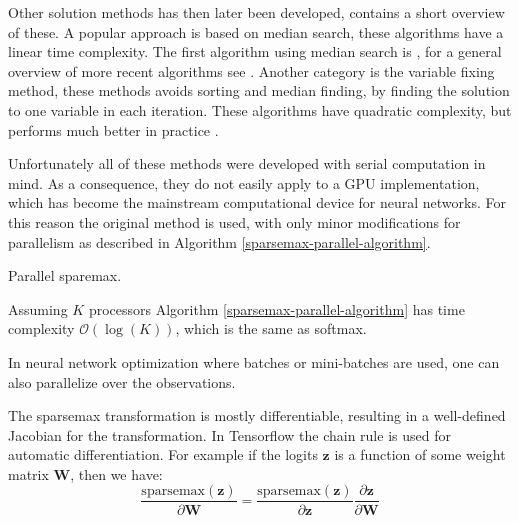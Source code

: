 Other solution methods has then later been developed, \cite{Liu2016} contains a short overview of these. A popular approach is based on median search, these algorithms have a linear time complexity. The first algorithm using median search is \cite{brucker1984a}, for a general overview of more recent algorithms see \cite{kiwiel2008a-median}. Another category is the variable fixing method, these methods avoids sorting and median finding, by finding the solution to one variable in each iteration. These algorithms have quadratic complexity, but performs much better in practice \cite{kiwiel2008a-fixing}.

Unfortunately all of these methods were developed with serial computation in mind. As a consequence, they do not easily apply to a GPU implementation, which has become the mainstream computational device for neural networks. For this reason the original method \cite{Helgason1980} is used, with only minor modifications for parallelism as described in Algorithm \ref{sparsemax-parallel-algorithm}.

\begin{algorithm}[H]
  \caption{Parallel sparemax.}
  \begin{algorithmic}[1]
       
       
       
      \State {}
    \EndFunction
  \end{algorithmic}
  \label{sparsemax-parallel-algorithm}
\end{algorithm}

Assuming $K$ processors Algorithm \ref{sparsemax-parallel-algorithm} has time complexity $\mathcal{O}(\log(K))$, which is the same as softmax.

In neural network optimization where batches or mini-batches are used, one can also parallelize over the observations.

The sparsemax transformation is mostly differentiable, resulting in a well-defined Jacobian for the transformation. In Tensorflow \cite{tensorflow2015-whitepaper} the chain rule is used for automatic differentiation. For example if the logits $\mathbf{z}$ is a function of some weight matrix $\mathbf{W}$, then we have:
\begin{equation}
\frac{\mathrm{sparsemax}(\mathbf{z})}{\partial \mathbf{W}} = \frac{\mathrm{sparsemax}(\mathbf{z})}{\partial \mathbf{z}} \frac{\partial \mathbf{z}}{\partial \mathbf{W}}
\end{equation}

